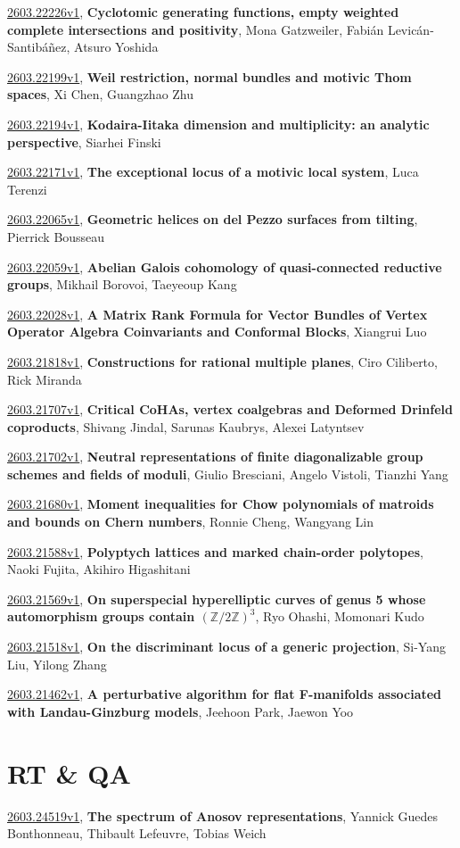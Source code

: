 \documentclass[9pt, a4paper]{article}
\theoremstyle{plain}
\theoremstyle{definition}
\theoremstyle{remark}
\newcommand{\arxiv}[3]{\href{https://arxiv.org/abs/#1}{#1}, \textbf{\textcolor{arxivblue}{#2}}, #3}
\begin{document}
\arxiv{2603.22226v1}{Cyclotomic generating functions, empty weighted complete intersections and positivity}{Mona Gatzweiler, Fabián Levicán-Santibáñez, Atsuro Yoshida}

\arxiv{2603.22199v1}{Weil restriction, normal bundles and motivic Thom spaces}{Xi Chen, Guangzhao Zhu}

\arxiv{2603.22194v1}{Kodaira-Iitaka dimension and multiplicity: an analytic perspective}{Siarhei Finski}

\arxiv{2603.22171v1}{The exceptional locus of a motivic local system}{Luca Terenzi}

\arxiv{2603.22065v1}{Geometric helices on del Pezzo surfaces from tilting}{Pierrick Bousseau}

\arxiv{2603.22059v1}{Abelian Galois cohomology of quasi-connected reductive groups}{Mikhail Borovoi, Taeyeoup Kang}

\arxiv{2603.22028v1}{A Matrix Rank Formula for Vector Bundles of Vertex Operator Algebra Coinvariants and Conformal Blocks}{Xiangrui Luo}

\arxiv{2603.21818v1}{Constructions for rational multiple planes}{Ciro Ciliberto, Rick Miranda}

\arxiv{2603.21707v1}{Critical CoHAs, vertex coalgebras and Deformed Drinfeld coproducts}{Shivang Jindal, Sarunas Kaubrys, Alexei Latyntsev}

\arxiv{2603.21702v1}{Neutral representations of finite diagonalizable group schemes and fields of moduli}{Giulio Bresciani, Angelo Vistoli, Tianzhi Yang}

\arxiv{2603.21680v1}{Moment inequalities for Chow polynomials of matroids and bounds on Chern numbers}{Ronnie Cheng, Wangyang Lin}

\arxiv{2603.21588v1}{Polyptych lattices and marked chain-order polytopes}{Naoki Fujita, Akihiro Higashitani}

\arxiv{2603.21569v1}{On superspecial hyperelliptic curves of genus 5 whose automorphism groups contain $(\mathbb{Z}/2\mathbb{Z})^3$}{Ryo Ohashi, Momonari Kudo}

\arxiv{2603.21518v1}{On the discriminant locus of a generic projection}{Si-Yang Liu, Yilong Zhang}

\arxiv{2603.21462v1}{A perturbative algorithm for flat F-manifolds associated with Landau-Ginzburg models}{Jeehoon Park, Jaewon Yoo}


\section{RT \& QA}
\arxiv{2603.24519v1}{The spectrum of Anosov representations}{Yannick Guedes Bonthonneau, Thibault Lefeuvre, Tobias Weich}
\end{document}

